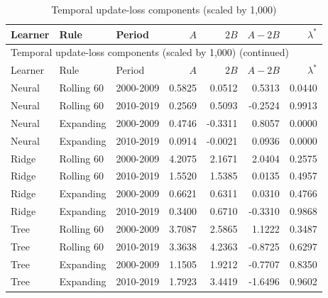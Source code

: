 {\small\setlength{\tabcolsep}{4pt}
\begin{longtable}{@{}lllrrrr@{}}
\caption{Temporal update-loss components (scaled by 1,000)}\label{tab:decomposition}\\
\toprule
Learner & Rule & Period & $A$ & $2B$ & $A-2B$ & $\lambda^*$\\\midrule\endfirsthead
\multicolumn{7}{l}{Temporal update-loss components (scaled by 1,000) (continued)}\\\toprule
Learner & Rule & Period & $A$ & $2B$ & $A-2B$ & $\lambda^*$\\\midrule\endhead
\bottomrule\endfoot
Neural & Rolling 60 & 2000-2009 & 0.5825 & 0.0512 & 0.5313 & 0.0440\\
Neural & Rolling 60 & 2010-2019 & 0.2569 & 0.5093 & -0.2524 & 0.9913\\
Neural & Expanding & 2000-2009 & 0.4746 & -0.3311 & 0.8057 & 0.0000\\
Neural & Expanding & 2010-2019 & 0.0914 & -0.0021 & 0.0936 & 0.0000\\
Ridge & Rolling 60 & 2000-2009 & 4.2075 & 2.1671 & 2.0404 & 0.2575\\
Ridge & Rolling 60 & 2010-2019 & 1.5520 & 1.5385 & 0.0135 & 0.4957\\
Ridge & Expanding & 2000-2009 & 0.6621 & 0.6311 & 0.0310 & 0.4766\\
Ridge & Expanding & 2010-2019 & 0.3400 & 0.6710 & -0.3310 & 0.9868\\
Tree & Rolling 60 & 2000-2009 & 3.7087 & 2.5865 & 1.1222 & 0.3487\\
Tree & Rolling 60 & 2010-2019 & 3.3638 & 4.2363 & -0.8725 & 0.6297\\
Tree & Expanding & 2000-2009 & 1.1505 & 1.9212 & -0.7707 & 0.8350\\
Tree & Expanding & 2010-2019 & 1.7923 & 3.4419 & -1.6496 & 0.9602\\
\end{longtable}
}
